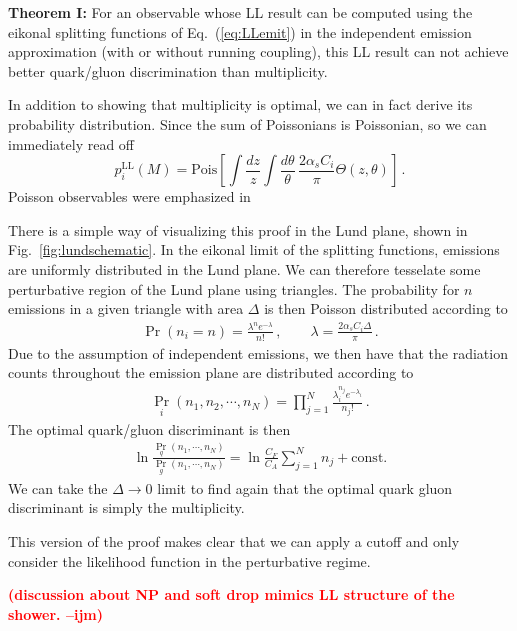 \documentclass[letterpaper,11pt]{article}
\DeclareRobustCommand{\Fig}[1]{Fig.~\ref{#1}}
\DeclareRobustCommand{\Eq}[1]{Eq.~(\ref{#1})}
\newcommand{\ijm}[1]{\marginpar{\raggedright\scriptsize\textbf{\textcolor{red}{ijm}}}  \textbf{\textcolor{red}{(#1 --ijm)}}}
\begin{document}
\vspace{1cm}
{\bf Theorem I:} For an observable whose LL result can be computed using the eikonal splitting functions of \Eq{eq:LLemit} in the independent emission approximation (with or without running coupling), this LL result can not achieve better quark/gluon discrimination than multiplicity.
\vspace{1cm}


In addition to showing that multiplicity is optimal, we can in fact derive its probability distribution. Since the sum of Poissonians is Poissonian, so we can immediately read off
\begin{equation}
p^\text{LL}_i(M) = \text{Pois}\left[\int \frac{dz}{z} \int \frac{d\theta}{\theta}\, \frac{2\alpha_s C_i}{\pi} \Theta(z,\theta)\right]\,.
\end{equation}
Poisson observables were emphasized in
\cite{Frye:2017yrw}

There is a simple way of visualizing this proof in the Lund plane, shown in \Fig{fig:lundschematic}.
%
In the eikonal limit of the splitting functions, emissions are uniformly distributed in the Lund plane.
%
We can therefore tesselate some perturbative region of the Lund plane using triangles.
%
The probability for $n$ emissions in a given triangle with area $\Delta$ is then Poisson distributed according to
\begin{align}
\Pr(n_i=n)=\frac{\lambda^n e^{-\lambda}}{n!}\,, \qquad \lambda=\frac{2\alpha_s C_i \Delta}{\pi}\,.
\end{align}
Due to the assumption of independent emissions, we then have that the radiation counts throughout the emission plane are distributed according to
\begin{align}
{\Pr}_i(n_1, n_2, \cdots, n_N)=\prod\limits_{j=1}^N \frac{\lambda_i^{n_j} e^{-\lambda_i}}{n_j!}\,.
\end{align}
The optimal quark/gluon discriminant is then
\begin{align}
\ln \frac{{\Pr}_q(n_1, \cdots, n_N)}{{\Pr}_g(n_1, \cdots, n_N)}  = \ln \frac{C_F}{C_A} \sum\limits_{j=1}^N n_j  + \text{const}.
\end{align}
We can take the $\Delta\to 0$ limit to find again that the optimal quark gluon discriminant is simply the multiplicity.

This version of the proof makes clear that we can apply a cutoff and only consider the likelihood function in the perturbative regime.

\ijm{discussion about NP and soft drop mimics LL structure of the shower.}
\end{document}
